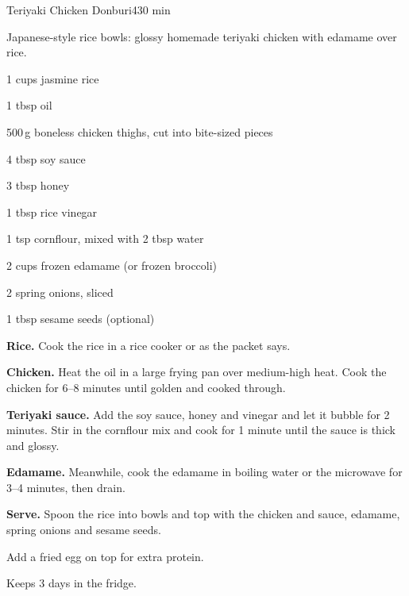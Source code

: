 \begin{recipebox}{Teriyaki Chicken Donburi}{4}{30 min}

Japanese-style rice bowls: glossy homemade teriyaki chicken with edamame over
rice.

\begin{ingredients}
  \item 1 cups jasmine rice
  \item 1 tbsp oil
  \item 500\,g boneless chicken thighs, cut into bite-sized pieces
  \item 4 tbsp soy sauce
  \item 3 tbsp honey
  \item 1 tbsp rice vinegar
  \item 1 tsp cornflour, mixed with 2 tbsp water
  \item 2 cups frozen edamame (or frozen broccoli)
  \item 2 spring onions, sliced
  \item 1 tbsp sesame seeds (optional)
\end{ingredients}

\begin{method}
  \item \textbf{Rice.} Cook the rice in a rice cooker or as the packet says.
  \item \textbf{Chicken.} Heat the oil in a large frying pan over medium-high heat.
        Cook the chicken for 6--8 minutes until golden and cooked through.
  \item \textbf{Teriyaki sauce.} Add the soy sauce, honey and vinegar and let it
        bubble for 2 minutes. Stir in the cornflour mix and cook for 1 minute until
        the sauce is thick and glossy.
  \item \textbf{Edamame.} Meanwhile, cook the edamame in boiling water or the
        microwave for 3--4 minutes, then drain.
  \item \textbf{Serve.} Spoon the rice into bowls and top with the chicken and sauce,
        edamame, spring onions and sesame seeds.
\end{method}

\begin{notelist}
  \item Add a fried egg on top for extra protein.
  \item Keeps 3 days in the fridge.
\end{notelist}

\end{recipebox}

